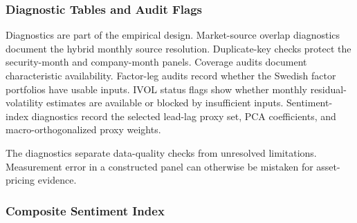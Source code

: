\documentclass[11pt]{article}
\begin{document}
\subsubsection{Diagnostic Tables and Audit Flags}
\label{app:diagnostic_audit_flags}

Diagnostics are part of the empirical design. Market-source overlap diagnostics document the hybrid monthly source resolution. Duplicate-key checks protect the security-month and company-month panels. Coverage audits document characteristic availability. Factor-leg audits record whether the Swedish factor portfolios have usable inputs. IVOL status flags show whether monthly residual-volatility estimates are available or blocked by insufficient inputs. Sentiment-index diagnostics record the selected lead-lag proxy set, PCA coefficients, and macro-orthogonalized proxy weights.

The diagnostics separate data-quality checks from unresolved limitations. Measurement error in a constructed panel can otherwise be mistaken for asset-pricing evidence.

\subsubsection{Composite Sentiment Index}
\end{document}
